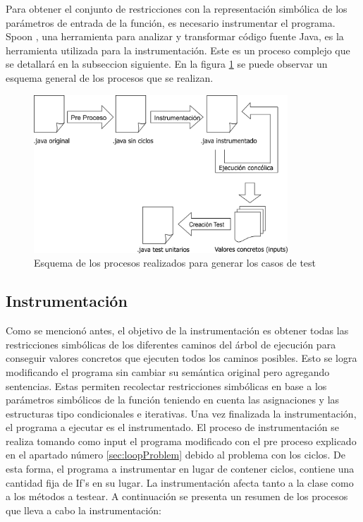 \documentclass{llncs}
\begin{document}
Para obtener el conjunto de restricciones con la representación simbólica de los parámetros de entrada de la función, es necesario instrumentar el programa.
Spoon \cite{spoon}, una herramienta para analizar y transformar código fuente Java, es la herramienta utilizada para la instrumentación.
Este es un proceso complejo que se detallará en la subseccion siguiente.
En la figura \ref{fig:procesosRealizados} se puede observar un esquema general de los procesos que se realizan.

\begin{figure}
\centering
\includegraphics[width=0.85\textwidth]{procesosRealizados}
\caption{Esquema de los procesos realizados para generar los casos de test}
\label{fig:procesosRealizados}
\end{figure}

\subsection{Instrumentación}
Como se mencionó antes, el objetivo de la instrumentación es obtener todas las restricciones simbólicas de los diferentes caminos del árbol de
ejecución para conseguir valores concretos que ejecuten todos los caminos posibles. Esto se logra modificando el programa sin cambiar su semántica original
pero agregando sentencias. Estas permiten recolectar restricciones simbólicas en base a los parámetros simbólicos de la función teniendo en cuenta las asignaciones
y las estructuras tipo condicionales e iterativas. Una vez finalizada la instrumentación, el programa a ejecutar es el instrumentado.
El proceso de instrumentación se realiza tomando como input el programa modificado con el pre proceso explicado en el apartado número \ref{sec:loopProblem}
debido al problema con los ciclos. De esta forma, el programa a instrumentar en lugar de contener ciclos, contiene una cantidad fija de If’s en su lugar.
La instrumentación afecta tanto a la clase como a los métodos a testear. A continuación se presenta un resumen de los procesos que lleva a cabo la instrumentación:
\end{document}
